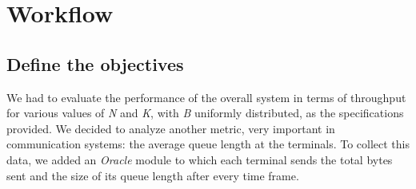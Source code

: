 \chapter{Workflow}

\section{Define the objectives}
We had to evaluate the performance of the overall system in terms of throughput for various values of \emph{N} and \emph{K}, with \emph{B} uniformly distributed, as the specifications 
provided. We decided to analyze another metric, very important in communication systems: the average queue length at the terminals. To collect this data, we added an \emph{Oracle} module to which
each terminal sends the total bytes sent and the size of its queue length after every time frame.